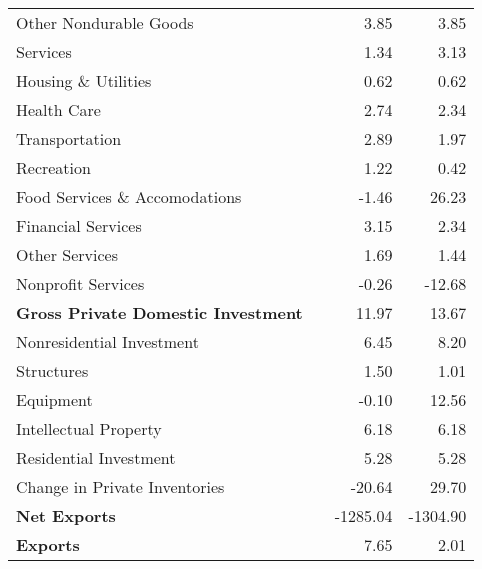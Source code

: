 \documentclass[11pt, letterpaper]{article}\usepackage[]{graphicx}\usepackage[]{color}
\begin{document}
\begin{table}[H]
\begin{tabular}{lrrr}
  \hspace{24mm}  Other Nondurable Goods &  & 3.85 & 3.85 \\ 
  \hspace{8mm}  Services &  & 1.34 & 3.13 \\ 
  \hspace{16mm}  Housing \& Utilities &  & 0.62 & 0.62 \\ 
  \hspace{16mm}  Health Care &  & 2.74 & 2.34 \\ 
  \hspace{16mm}  Transportation &  & 2.89 & 1.97 \\ 
  \hspace{16mm}  Recreation &  & 1.22 & 0.42 \\ 
  \hspace{16mm}  Food Services \& Accomodations &  & -1.46 & 26.23 \\ 
  \hspace{16mm}  Financial Services &  & 3.15 & 2.34 \\ 
  \hspace{16mm}  Other Services &  & 1.69 & 1.44 \\ 
  \hspace{16mm}  Nonprofit Services &  & -0.26 & -12.68 \\ 
  \hspace{0mm} \textbf{Gross Private Domestic Investment} &  & 11.97 & 13.67 \\ 
  \hspace{8mm}  Nonresidential Investment &  & 6.45 & 8.20 \\ 
  \hspace{16mm}  Structures &  & 1.50 & 1.01 \\ 
  \hspace{16mm}  Equipment &  & -0.10 & 12.56 \\ 
  \hspace{16mm}  Intellectual Property &  & 6.18 & 6.18 \\ 
  \hspace{8mm}  Residential Investment &  & 5.28 & 5.28 \\ 
  \hspace{8mm}  Change in Private Inventories &  & -20.64 & 29.70 \\ 
  \hspace{0mm} \textbf{Net Exports} &  & -1285.04 & -1304.90 \\ 
  \hspace{0mm} \textbf{Exports} &  & 7.65 & 2.01 \\ 

\end{tabular}
\end{table}
\end{document}

